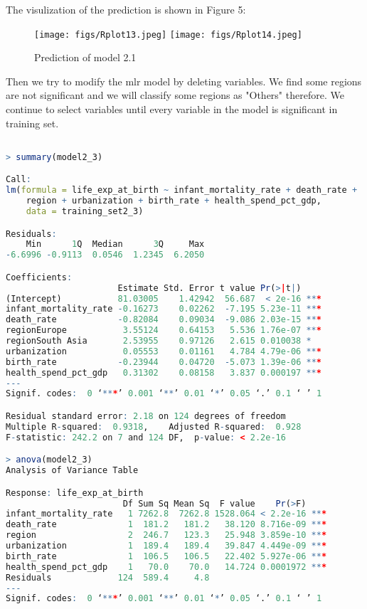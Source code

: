 The visulization of the prediction is shown in Figure 5:
\begin{figure}[!htbp]
\centering 
        \texttt{[image: figs/Rplot13.jpeg]}
        \texttt{[image: figs/Rplot14.jpeg]} \\
\caption[Prediction of model 2.1]{Prediction of model 2.1}
\label{fig:example} 
\end{figure}

Then we try to modify the mlr model by deleting variables. We find some regions are not significant and we will classify some regions as "Others" therefore. We continue to select variables until every variable in the model is significant in training set.

\begin{lstlisting}[language=R, caption=Result of the model]

> summary(model2_3)

Call:
lm(formula = life_exp_at_birth ~ infant_mortality_rate + death_rate + 
    region + urbanization + birth_rate + health_spend_pct_gdp, 
    data = training_set2_3)

Residuals:
    Min      1Q  Median      3Q     Max 
-6.6996 -0.9113  0.0546  1.2345  6.2050 

Coefficients:
                      Estimate Std. Error t value Pr(>|t|)    
(Intercept)           81.03005    1.42942  56.687  < 2e-16 ***
infant_mortality_rate -0.16273    0.02262  -7.195 5.23e-11 ***
death_rate            -0.82084    0.09034  -9.086 2.03e-15 ***
regionEurope           3.55124    0.64153   5.536 1.76e-07 ***
regionSouth Asia       2.53955    0.97126   2.615 0.010038 *  
urbanization           0.05553    0.01161   4.784 4.79e-06 ***
birth_rate            -0.23944    0.04720  -5.073 1.39e-06 ***
health_spend_pct_gdp   0.31302    0.08158   3.837 0.000197 ***
---
Signif. codes:  0 ‘***’ 0.001 ‘**’ 0.01 ‘*’ 0.05 ‘.’ 0.1 ‘ ’ 1

Residual standard error: 2.18 on 124 degrees of freedom
Multiple R-squared:  0.9318,	Adjusted R-squared:  0.928 
F-statistic: 242.2 on 7 and 124 DF,  p-value: < 2.2e-16

> anova(model2_3)
Analysis of Variance Table

Response: life_exp_at_birth
                       Df Sum Sq Mean Sq  F value    Pr(>F)    
infant_mortality_rate   1 7262.8  7262.8 1528.064 < 2.2e-16 ***
death_rate              1  181.2   181.2   38.120 8.716e-09 ***
region                  2  246.7   123.3   25.948 3.859e-10 ***
urbanization            1  189.4   189.4   39.847 4.449e-09 ***
birth_rate              1  106.5   106.5   22.402 5.927e-06 ***
health_spend_pct_gdp    1   70.0    70.0   14.724 0.0001972 ***
Residuals             124  589.4     4.8                       
---
Signif. codes:  0 ‘***’ 0.001 ‘**’ 0.01 ‘*’ 0.05 ‘.’ 0.1 ‘ ’ 1

\end{lstlisting}

